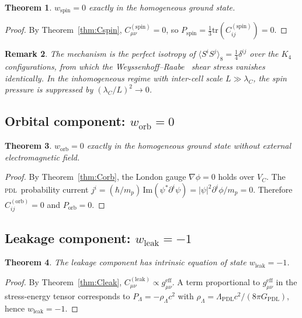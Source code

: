 \documentclass[12pt,a4paper]{article}
\newtheorem{theorem}{Theorem}[section]
\newtheorem{remark}[theorem]{Remark}
\newcommand{\Kfour}{K_4}
\newcommand{\hb}{\hbar}
\newcommand{\PDL}{\textsc{pdl}}
\newcommand{\Cspin}{C^{(\mathrm{spin})}}
\newcommand{\Corb}{C^{(\mathrm{orb})}}
\newcommand{\Cleak}{C^{(\mathrm{leak})}}
\newcommand{\GPDL}{G_{\mathrm{PDL}}}
\newcommand{\geff}{g_{\mu\nu}^{\mathrm{eff}}}
\newcommand{\VC}{V_C}
\newcommand{\lambdaC}{\lambda_C}
\newcommand{\LambdaPDL}{\Lambda_{\mathrm{PDL}}}
\newcommand{\rhoLambda}{\rho_\Lambda}
\begin{document}
\begin{theorem}
\label{thm:wspin}
$w_{\mathrm{spin}} = 0$ exactly in the homogeneous ground state.
\end{theorem}

\begin{proof}
By Theorem~\ref{thm:Cspin}, $\Cspin_{\mu\nu} = 0$, so $P_{\mathrm{spin}} = \tfrac{1}{3}\mathrm{tr}(C^{(\mathrm{spin})}_{ij}) = 0$.
\end{proof}

\begin{remark}
The mechanism is the perfect isotropy of $\langle S^i S^j\rangle_8 = \tfrac{1}{4}\delta^{ij}$ over the $\Kfour$ configurations, from which the Weyssenhoff--Raabe~\cite{Weyssenhoff_1947} shear stress vanishes identically. In the inhomogeneous regime with inter-cell scale $L \gg \lambdaC$, the spin pressure is suppressed by $(\lambdaC/L)^2 \to 0$.
\end{remark}

\subsection{Orbital component: \texorpdfstring{$w_{\mathrm{orb}} = 0$}{w\_orb = 0}}

\begin{theorem}
\label{thm:worb}
$w_{\mathrm{orb}} = 0$ exactly in the homogeneous ground state without external electromagnetic field.
\end{theorem}

\begin{proof}
By Theorem~\ref{thm:Corb}, the London gauge $\nabla\phi = 0$ holds over $\VC$. The \PDL\ probability current $j^i = (\hb/m_p)\,\mathrm{Im}(\psi^*\partial^i\psi) = |\psi|^2\partial^i\phi/m_p = 0$. Therefore $\Corb_{ij} = 0$ and $P_{\mathrm{orb}} = 0$.
\end{proof}

\subsection{Leakage component: \texorpdfstring{$w_{\mathrm{leak}} = -1$}{w\_leak = -1}}

\begin{theorem}
\label{thm:wleak}
The leakage component has intrinsic equation of state $w_{\mathrm{leak}} = -1$.
\end{theorem}

\begin{proof}
By Theorem~\ref{thm:Cleak}, $\Cleak_{\mu\nu} \propto \geff$. A term proportional to $\geff$ in the stress-energy tensor corresponds to $P_\Lambda = -\rhoLambda c^2$ with $\rhoLambda = \LambdaPDL c^2/(8\pi\GPDL)$, hence $w_{\mathrm{leak}} = -1$.
\end{proof}
\end{document}
